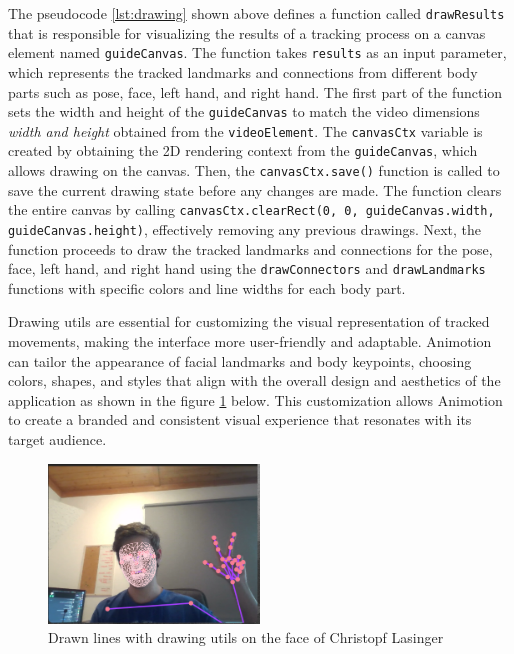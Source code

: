 The pseudocode \ref{lst:drawing} shown above defines a function called \texttt{drawResults} that is responsible for visualizing the results of a tracking process on a canvas element 
named \texttt{guideCanvas}. The function takes \texttt{results} as an input parameter, which represents the tracked landmarks and connections from different body parts such as 
pose, face, left hand, and right hand. The first part of the function sets the width and height of the \texttt{guideCanvas} to 
match the video dimensions \emph{width and height} obtained from the \texttt{videoElement}.
The \texttt{canvasCtx} variable is created by obtaining the 2D rendering context from the \texttt{guideCanvas}, which allows drawing on the canvas.
Then, the \texttt{canvasCtx.save()} function is called to save the current drawing state before any changes are made.
The function clears the entire canvas by calling \texttt{canvasCtx.clearRect(0, 0, guideCanvas.width, guideCanvas.height)}, effectively removing any previous drawings.
Next, the function proceeds to draw the tracked landmarks and connections for the pose, face, left hand, and right hand using the \texttt{drawConnectors} 
and \texttt{drawLandmarks} functions with specific colors and line widths for each body part.

Drawing utils are essential for customizing the visual representation of tracked movements, 
making the interface more user-friendly and adaptable. Animotion can tailor the appearance of facial landmarks and body keypoints, 
choosing colors, shapes, and styles that align with the overall design and aesthetics of the application as shown in the figure \ref{fig:lasifacetracking} below. This customization allows Animotion 
to create a branded and consistent visual experience that resonates with its target audience.
\\
\begin{figure}[htb]
  \centering
  \includegraphics[width=0.5\textwidth]{pics/lasifacetracking.png}
  \caption{Drawn lines with drawing utils on the face of Christopf Lasinger}
  \label{fig:lasifacetracking}
\end{figure}

